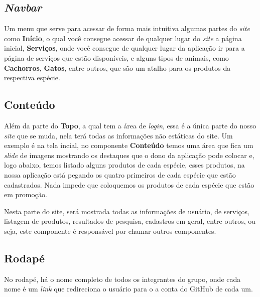 \subsection{\emph{Navbar}}
Um menu que serve para acessar de forma mais intuitiva algumas partes do
\emph{site} como \textbf{Início}, o qual você consegue acessar de qualquer lugar
do \emph{site} a página inicial, \textbf{Serviços}, onde você consegue de
qualquer lugar da aplicação ir para a página de serviços que estão disponíveis,
e alguns tipos de animais, como \textbf{Cachorros}, \textbf{Gatos}, entre
outros, que são um atalho para os produtos da respectiva espécie.

\subsection{Conteúdo}
Além da parte do \textbf{Topo}, a qual tem a área de \emph{login}, essa é a
única parte do nosso \emph{site} que se muda, nela terá todas as informações não
estáticas do site. Um exemplo é na tela incial, no componente \textbf{Conteúdo}
temos uma área que fica um \emph{slide} de imagens mostrando os destaques que o
dono da aplicação pode colocar e, logo abaixo, temos listado alguns produtos de
cada espécie, esses produtos, na nossa aplicação está pegando os quatro
primeiros de cada espécie que estão cadastrados. Nada impede que coloquemos os
produtos de cada espécie que estão em promoção.

Nesta parte do site, será mostrada todas as informações de usuário, de serviços,
listagem de produtos, resultados de pesquisa, cadastros em geral, entre outros,
ou seja, este componente é responsável por chamar outros componentes.

\subsection{Rodapé}
No rodapé, há o nome completo de todos os integrantes do grupo, onde cada nome é
um \emph{link} que redireciona o usuário para o a conta do GitHub de cada um.
